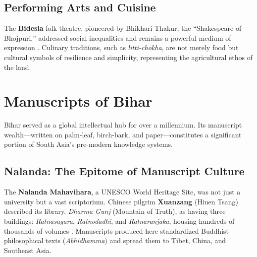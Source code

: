 \documentclass{article}
\begin{document}
\subsection{Performing Arts and Cuisine}
The \textbf{Bidesia} folk theatre, pioneered by Bhikhari Thakur, the “Shakespeare of Bhojpuri,” addressed social inequalities and remains a powerful medium of expression \cite{thakur2014bidesia}. Culinary traditions, such as \textit{litti-chokha}, are not merely food but cultural symbols of resilience and simplicity, representing the agricultural ethos of the land.

\section{Manuscripts of Bihar}
Bihar served as a global intellectual hub for over a millennium. Its manuscript wealth—written on palm-leaf, birch-bark, and paper—constitutes a significant portion of South Asia’s pre-modern knowledge systems.

\subsection{Nalanda: The Epitome of Manuscript Culture}
The \textbf{Nalanda Mahavihara}, a UNESCO World Heritage Site, was not just a university but a vast scriptorium. Chinese pilgrim \textbf{Xuanzang} (Hiuen Tsang) described its library, \textit{Dharma Gunj} (Mountain of Truth), as having three buildings: \textit{Ratnasagara}, \textit{Ratnodadhi}, and \textit{Ratnaranjaka}, housing hundreds of thousands of volumes \cite{schopen2004nalanda}. Manuscripts produced here standardized Buddhist philosophical texts (\textit{Abhidhamma}) and spread them to Tibet, China, and Southeast Asia.
\end{document}
